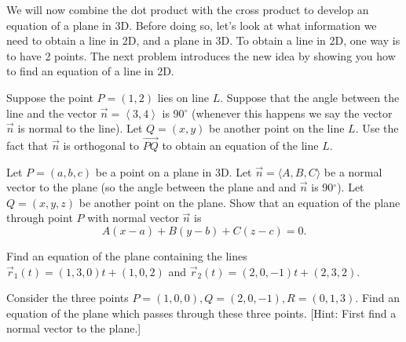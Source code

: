 \vskip0.2in

We will now combine the dot product with the cross product to develop an equation of a plane in 3D. 
Before doing so, let's look at what information we need to obtain a line in 2D, and a plane in 3D.  
To obtain a line in 2D, one way is to have 2 points. 
The next problem introduces the new idea by showing you how to find an equation of a line in 2D. 

\begin{problem}\label{prob:plane equation normal point}
Suppose the point $P=(1,2)$ lies on line $L$. Suppose that the angle between the line and the vector $\vec n=\left<3,4\right>$ is 90$^\circ$ (whenever this happens we say the vector $\vec n$ is normal to the line). Let $Q=(x,y)$ be another point on the line $L$. Use the fact that $\vec n$ is orthogonal to $\vec {PQ}$ to obtain an equation of the line $L$. 
\end{problem}


\begin{problem}\label{plane equation three points}
%
Let $P=(a,b,c)$ be a point on a plane in 3D. Let $\vec n=\langle A,B,C \rangle $ be a normal vector to the plane (so the angle between the plane and and $\vec n$ is 90$^\circ$).  Let $Q=(x,y,z)$ be another point on the plane.  Show that an equation of the plane through point $P$ with normal vector $\vec n$ is $$A(x-a)+B(y-b)+C(z-c)=0.$$
\end{problem}



\begin{problem}\label{plane equation 2 lines}
%
Find an equation of the plane containing the lines $\vec r_1(t)=(1,3,0)t+(1,0,2)$ and $\vec r_2(t)=(2,0,-1)t+(2,3,2)$.
\end{problem}

\begin{problem}  
%
Consider the three points $P=(1,0,0), Q=(2,0,-1), R=(0,1,3)$. Find an equation of the plane which passes through these three points.  [Hint: First find a normal vector to the plane.]
\end{problem}

